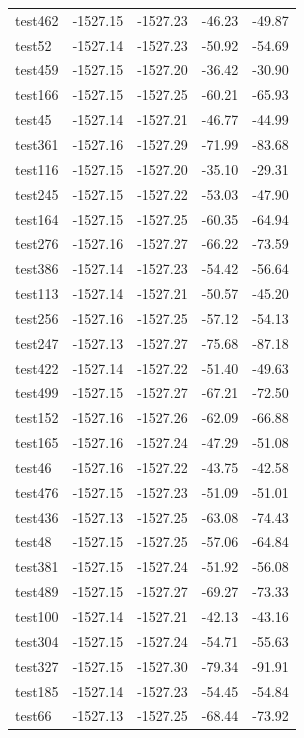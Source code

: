 \documentclass[journal=jacsat,manuscript=article]{achemso}
\begin{document}
\begin{table}[b!]
\begin{tabular}{lrrrr}
test462 &  -1527.15 &  -1527.23 &  -46.23 &  -49.87 \\
test52  &  -1527.14 &  -1527.23 &  -50.92 &  -54.69 \\
test459 &  -1527.15 &  -1527.20 &  -36.42 &  -30.90 \\
test166 &  -1527.15 &  -1527.25 &  -60.21 &  -65.93 \\
test45  &  -1527.14 &  -1527.21 &  -46.77 &  -44.99 \\
test361 &  -1527.16 &  -1527.29 &  -71.99 &  -83.68 \\
test116 &  -1527.15 &  -1527.20 &  -35.10 &  -29.31 \\
test245 &  -1527.15 &  -1527.22 &  -53.03 &  -47.90 \\
test164 &  -1527.15 &  -1527.25 &  -60.35 &  -64.94 \\
test276 &  -1527.16 &  -1527.27 &  -66.22 &  -73.59 \\
test386 &  -1527.14 &  -1527.23 &  -54.42 &  -56.64 \\
test113 &  -1527.14 &  -1527.21 &  -50.57 &  -45.20 \\
test256 &  -1527.16 &  -1527.25 &  -57.12 &  -54.13 \\
test247 &  -1527.13 &  -1527.27 &  -75.68 &  -87.18 \\
test422 &  -1527.14 &  -1527.22 &  -51.40 &  -49.63 \\
test499 &  -1527.15 &  -1527.27 &  -67.21 &  -72.50 \\
test152 &  -1527.16 &  -1527.26 &  -62.09 &  -66.88 \\
test165 &  -1527.16 &  -1527.24 &  -47.29 &  -51.08 \\
test46  &  -1527.16 &  -1527.22 &  -43.75 &  -42.58 \\
test476 &  -1527.15 &  -1527.23 &  -51.09 &  -51.01 \\
test436 &  -1527.13 &  -1527.25 &  -63.08 &  -74.43 \\
test48  &  -1527.15 &  -1527.25 &  -57.06 &  -64.84 \\
test381 &  -1527.15 &  -1527.24 &  -51.92 &  -56.08 \\
test489 &  -1527.15 &  -1527.27 &  -69.27 &  -73.33 \\
test100 &  -1527.14 &  -1527.21 &  -42.13 &  -43.16 \\
test304 &  -1527.15 &  -1527.24 &  -54.71 &  -55.63 \\
test327 &  -1527.15 &  -1527.30 &  -79.34 &  -91.91 \\
test185 &  -1527.14 &  -1527.23 &  -54.45 &  -54.84 \\
test66  &  -1527.13 &  -1527.25 &  -68.44 &  -73.92 \\
\bottomrule
\end{tabular}
\end{table}
\end{document}

